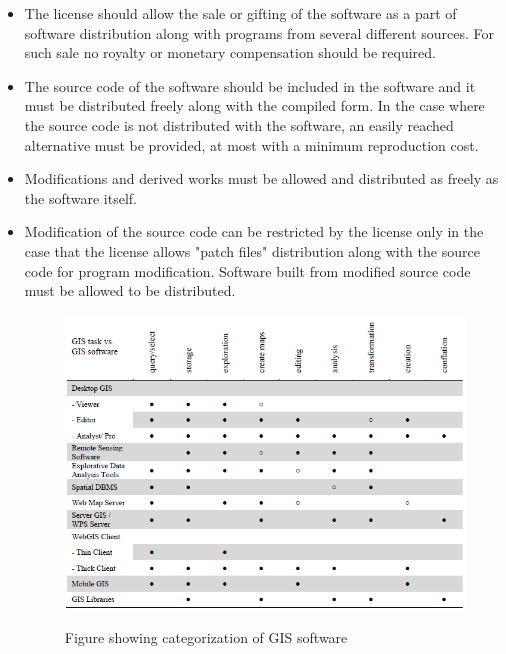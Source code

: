 \begin{itemize}
\item The license should allow the sale or gifting of the software as a part of software distribution along with programs from several different sources. For such sale no royalty or monetary compensation should be required.
\item The source code of the software should be included in the software and it must be distributed freely along with the compiled form. In the case where the source code is not distributed with the software, an easily reached alternative must be provided, at most with a minimum reproduction cost.
\item Modifications and derived works must be allowed and distributed as freely as the software itself.
\item Modification of the source code can be restricted by the license only in the case that the license allows "patch files" distribution along with the source code for program modification. Software built from modified source code must be allowed to be distributed. 

\begin{figure}[H]
\centering
	{\includegraphics[width=\linewidth]{gfx/OS.png}}
\caption{Figure showing categorization of GIS software \citep{osarticle}}
\label{fig:giscategory}
\end{figure}


\end{itemize}
